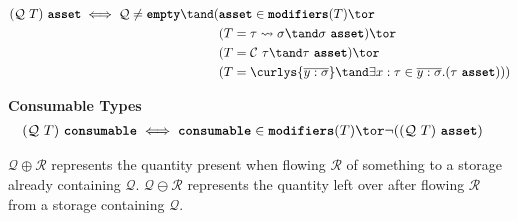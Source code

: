 \documentclass[10pt]{article}
\begin{document}
\begin{align*}
    (\mathcal{Q}~T)~\asset \iff \mathcal{Q} \neq \emptyq \tand (& \asset \in \modifiers(T) \tor \\
                                                                & (T = \tau \transforms \sigma \tand \sigma~\asset) \tor \\
                                                                & (T = \mathcal{C}~\tau \tand \tau~\asset) \tor \\
                                                                & (T = \curlys{\overline{y : \sigma}} \tand \exists x : \tau \in \overline{y : \sigma}. (\tau~\asset)))
\end{align*}

\framebox{$\tau~\consumable$} \textbf{Consumable Types}
\begin{align*}
    (\mathcal{Q}~T)~\consumable &\iff \consumable \in \modifiers(T) \tor \lnot((\mathcal{Q}~T)~\asset)
\end{align*}

$\mathcal{Q} \oplus \mathcal{R}$ represents the quantity present when flowing $\mathcal{R}$ of something to a storage already containing $\mathcal{Q}$.
$\mathcal{Q} \ominus \mathcal{R}$ represents the quantity left over after flowing $\mathcal{R}$ from a storage containing $\mathcal{Q}$.
\end{document}
